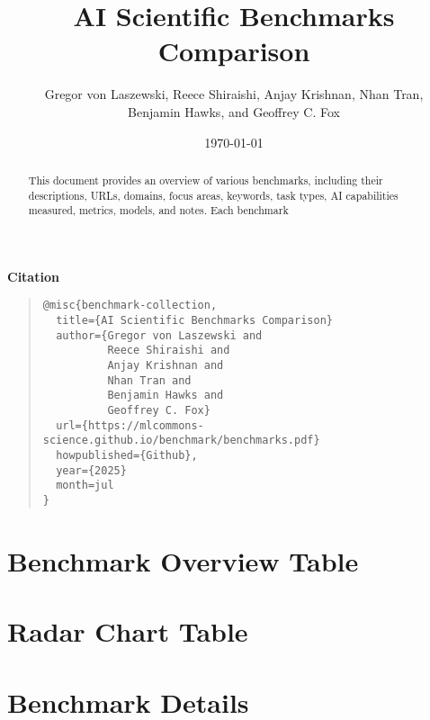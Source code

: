 \documentclass[10pt]{article}
\begin{document}
\sloppy
\author{Gregor von Laszewski,
          Reece Shiraishi, 
          Anjay Krishnan, 
          Nhan Tran, \\
          Benjamin Hawks, and 
          Geoffrey C. Fox}

\date{\today}
\title{AI Scientific Benchmarks Comparison}
\maketitle

\begin {abstract}
This document provides an overview of various benchmarks, including their descriptions, URLs, domains, focus areas, keywords, task types, AI capabilities measured, metrics, models, and notes. Each benchmark
\end{abstract}

\vfill 

{\centering \bfseries Citation \par}

\begin{quote}
\begin{verbatim}
@misc{benchmark-collection,
  title={AI Scientific Benchmarks Comparison}
  author={Gregor von Laszewski and 
          Reece Shiraishi and 
          Anjay Krishnan and 
          Nhan Tran and 
          Benjamin Hawks and 
          Geoffrey C. Fox}
  url={https://mlcommons-science.github.io/benchmark/benchmarks.pdf}
  howpublished={Github},
  year={2025}
  month=jul
}
\end{verbatim}
\end{quote}
\clearpage
\tableofcontents
\clearpage






\section{Benchmark Overview Table}



\clearpage


\section{Radar Chart Table}



\clearpage


\section{Benchmark Details}
\end{document}
